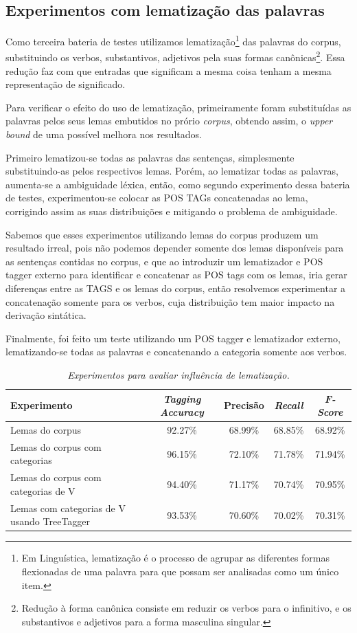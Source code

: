 \subsection{Experimentos com lematização das palavras}
\label{sec:lematizacao}

Como terceira bateria de testes utilizamos lematização\footnote{Em Linguística, lematização é o processo de agrupar as diferentes formas flexionadas de uma palavra para que possam ser analisadas como um único item.} das palavras do corpus, substituindo os verbos,
substantivos, adjetivos pela suas formas canônicas\footnote{Redução à forma canônica consiste em reduzir os verbos para o infinitivo, e os substantivos e adjetivos para a forma masculina singular.}. Essa redução faz com que entradas que significam a mesma coisa tenham a mesma representação de significado.

Para verificar o efeito do uso de lematização, primeiramente foram substituídas as palavras pelos seus lemas embutidos no prório \emph{corpus}, obtendo assim, o \emph{upper bound} de uma possível melhora nos resultados.

Primeiro lematizou-se todas as palavras das sentenças, simplesmente substituindo-as pelos respectivos lemas. Porém, ao lematizar todas as palavras, aumenta-se a ambiguidade léxica, então, como segundo experimento dessa bateria de testes, experimentou-se colocar as POS TAGs concatenadas ao lema, corrigindo assim as suas distribuições e mitigando o problema de ambiguidade. 

Sabemos que esses experimentos utilizando lemas do corpus produzem um resultado irreal, pois não podemos depender somente dos lemas disponíveis para as sentenças contidas no corpus, e que ao introduzir um lematizador e POS tagger externo para identificar e concatenar as POS tags com os lemas, iria gerar diferenças entre as TAGS e os lemas do corpus, então resolvemos experimentar a concatenação somente para os verbos, cuja distribuição tem maior impacto na derivação sintática.

Finalmente, foi feito um teste utilizando um POS tagger e lematizador externo, lematizando-se todas as palavras e concatenando a categoria somente aos verbos.


\begin{table}[H]
\centering
\footnotesize
\caption{\it Experimentos para avaliar influência de lematização.}
	\begin{tabular}{|l|c|c|c|c|}
		\hline
		\textbf{Experimento} &  \textbf{\emph{Tagging Accuracy}} & \textbf{Precisão} & \textbf{\emph{Recall}} & \textbf{\emph{F-Score}} \\
		\hline
		Lemas do corpus & 92.27\% & 68.99\% & 68.85\% & 68.92\%\\
		\hline		
		Lemas do corpus com categorias & 96.15\% & 72.10\% & 71.78\% & 71.94\%\\
		\hline		
		Lemas do corpus com categorias de V & 94.40\% & 71.17\% & 70.74\% & 70.95\%\\
		\hline		
		Lemas com categorias de V usando TreeTagger & 93.53\% & 70.60\% & 70.02\% & 70.31\%\\
		\hline
	\end{tabular}
	\label{tab:terceiro_experimento}
\end{table}

